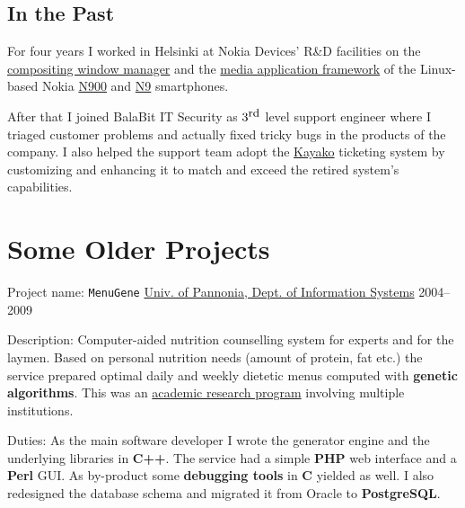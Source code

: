 \documentclass[a4paper,12pt]{article}
\newcommand\Yell{\textbf}
\newcommand\Label{\textsf}
\begin{document}
\subsection*{In the Past}

For four years I worked in Helsinki at \hypertarget{gadgets}{Nokia Devices'
R\&D facilities} on the
\href{http://wiki.maemo.org/Documentation/Maemo_5_Developer_Guide/Architecture/UI_Framework#hildon-desktop}{compositing window manager} and the
\href{http://wiki.maemo.org/Documentation/Maemo_5_Developer_Guide/Using_Multimedia_Components/Media_Application_Framework_(MAFW)}{media application framework}
of the Linux-based Nokia \href{http://maemo.org/intro/maemo_history}{N900}
and \href{http://en.wikipedia.org/wiki/Nokia_N9}{N9} smartphones.

\medskip
After that I joined BalaBit IT Security as $3^{\textrm{\small rd}}$ level
support engineer where I triaged customer problems and actually fixed
tricky bugs in the products of the company.  I also helped the support
team adopt the \href{http://www.kayako.com}{Kayako} ticketing system by
customizing and enhancing it to match and exceed the retired system's
capabilities.

\section{Some Older Projects}

\Label{Project name}: \texttt{MenuGene}\hfill
\href{http://virt.uni-pannon.hu/index.php/about-the-department}%
{Univ. of Pannonia, Dept. of Information Systems}
\Label{2004--2009}\par\medskip
\Label{Description}: Computer-aided nutrition counselling system for experts
and for the laymen.  Based on personal nutrition needs (amount of protein,
fat etc.) the service prepared optimal daily and weekly dietetic menus
computed with \Yell{genetic algorithms}.  This was an
\href{http://github.com/enadam/thesis/raw/master/thesis.pdf}%
{academic research program} involving multiple institutions.\par\medskip
\Label{Duties}: As the main software developer I wrote the generator engine
and the underlying libraries in \Yell{C++}.  The service had a simple
\Yell{PHP} web interface and a \Yell{Perl} GUI.  As by-product some
\Yell{debugging tools} in \Yell{C} yielded as well.  I also redesigned
the database schema and migrated it from Oracle to \Yell{PostgreSQL}.
\end{document}
